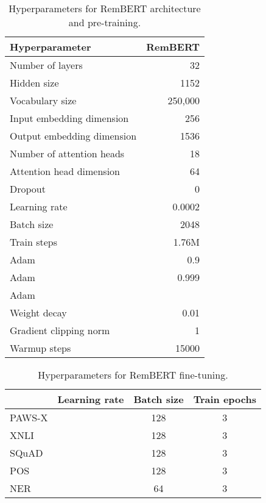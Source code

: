 \documentclass{article} \usepackage{iclr2021_conference,times}
\begin{document}
\begin{table*}[t]
\caption{Hyperparameters for RemBERT architecture and pre-training.}
\label{table:rembert_hparams}
\begin{center}
\begin{tabular}{lr}
\toprule
Hyperparameter & RemBERT \\
\midrule
Number of layers & 32 \\
Hidden size & 1152 \\
Vocabulary size & 250,000 \\
Input embedding dimension & 256 \\
Output embedding dimension & 1536 \\
Number of attention heads & 18 \\
Attention head dimension & 64 \\
Dropout & 0 \\
Learning rate & 0.0002 \\
Batch size & 2048 \\
Train steps & 1.76M \\
Adam  & 0.9 \\
Adam  & 0.999 \\
Adam  &  \\
Weight decay & 0.01 \\
Gradient clipping norm & 1 \\
Warmup steps & 15000 \\
\bottomrule
\end{tabular}
\end{center}
\end{table*}



\begin{table*}[t]
\caption{Hyperparameters for RemBERT fine-tuning.}
\label{table:rembert_fine-tuning_hparams}
\begin{center}
\begin{tabular}{lccc}
\toprule
 & Learning rate & Batch size & Train epochs \\
 \midrule
PAWS-X &  & 128 & 3 \\
XNLI &  & 128 & 3 \\
SQuAD &  & 128 & 3 \\
POS &  & 128 & 3 \\
NER &  & 64 & 3 \\
\bottomrule
\end{tabular}
\end{center}
\end{table*}
\end{document}
